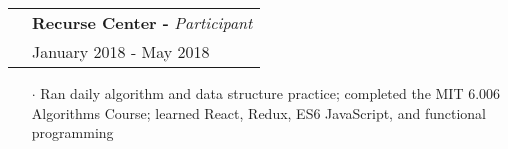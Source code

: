 \documentclass[a4paper, oneside, final]{scrartcl} %
\newcommand{\gray}{\rowcolor[gray]{.90}} %
\begin{document}
\begin{center}

  \vspace{-0.05cm}

  \begin{tabularx}{1.00\linewidth}{>{\raggedleft\scshape}p{0cm}X}
    \gray& \textbf{Recurse Center -} \textit{Participant}\\
    \gray& {January 2018 - May 2018}\\
  \end{tabularx}
  \vspace{-0.2cm}
  \begin{itemize} \itemsep-0.2cm
      \vspace{-0.1cm}

    \item[$\cdot$] Ran daily algorithm and data structure practice; completed the MIT 6.006 Algorithms Course; learned React, Redux, ES6 JavaScript, and functional programming
  \end{itemize}


\end{center}
\end{document}
